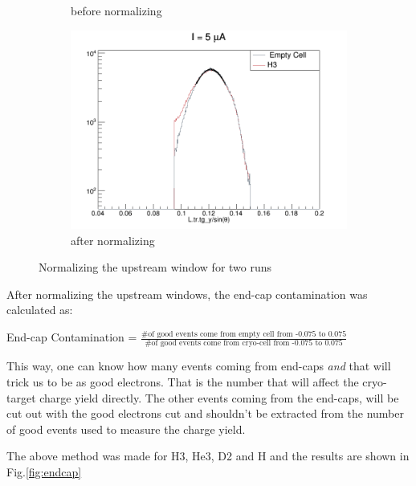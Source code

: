 \documentclass[11pt]{article}
\begin{document}
\begin{enumerate}
\begin{itemize}
{\begin{figure}[H]
\begin{subfigure}{.4\textwidth}
  \caption{before normalizing}
  \label{fig:scale1}
\end{subfigure}
\begin{subfigure}{.4\textwidth}
 \includegraphics[width=\linewidth]{scale5_H3_2.png}
  \caption{after normalizing}
  \label{fig:scale2}
\end{subfigure}
\caption{Normalizing the upstream window for two runs}
\label{fig:scale}
\end{figure}
After normalizing the upstream windows, the end-cap contamination was calculated as:
\begin{center}
End-cap Contamination = $\frac{\# \text{of good events come from empty cell from -0.075 to 0.075}}{\# \text{of good events come from cryo-cell from -0.075 to 0.075}}$
\end{center}
This way, one can know how many events coming from end-caps \emph{and} that will trick us to be as good electrons. That is the number that will affect the cryo-target charge yield directly. The other events coming from the end-caps, will be cut out with the good electrons cut and shouldn't be extracted from the number of good events used to measure the charge yield. \par
The above method was made for H3, He3, D2 and H and the results are shown in Fig.\ref{fig:endcap}

}
\end{itemize}
\end{enumerate}
\end{document}
